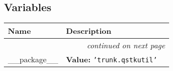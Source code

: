   \subsection{Variables}

    \vspace{-1cm}
\hspace{\varindent}\begin{longtable}{|p{\varnamewidth}|p{\vardescrwidth}|l}
\cline{1-2}
\cline{1-2} \centering \textbf{Name} & \centering \textbf{Description}& \\
\cline{1-2}
\endhead\cline{1-2}\multicolumn{3}{r}{\small\textit{continued on next page}}\\\endfoot\cline{1-2}
\endlastfoot\raggedright \_\-\_\-p\-a\-c\-k\-a\-g\-e\-\_\-\_\- & \raggedright \textbf{Value:} 
{\tt \texttt{'}\texttt{trunk.qstkutil}\texttt{'}}&\\
\cline{1-2}
\end{longtable}

